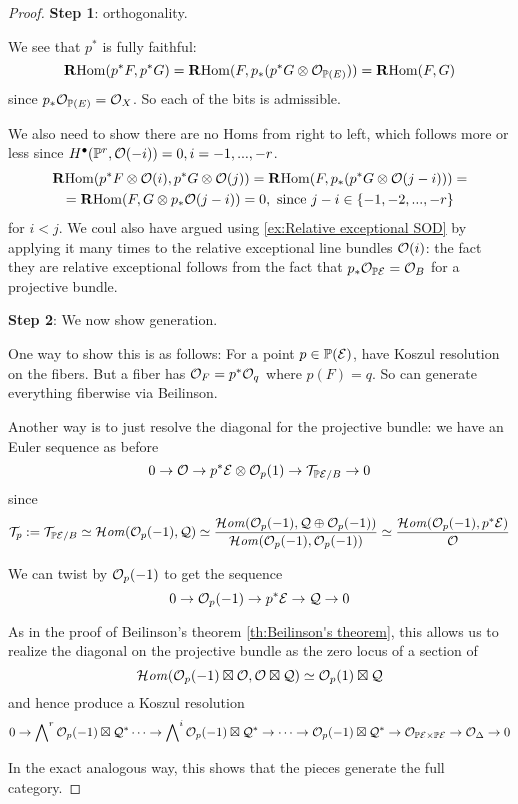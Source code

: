 \begin{proof}
    \textbf{Step 1}: orthogonality.

    We see that $p^*$ is fully faithful:
    \begin{equation*}
        \operatorname{\mathbf{R} Hom}(p^*F,p^*G) = \operatorname{\mathbf{R} Hom}(F,p_*(p^*G\otimes\mathcal{O}_{\mathbb{P}(E)})) = \operatorname{\mathbf{R} Hom}(F,G)
    \end{equation*}
    since $p_*\mathcal{O}_{\mathbb{P}(E)}=\mathcal{O}_X$. So each of the bits is admissible. 
    
    We also need to show there are no Homs from right to left, which follows more or less since $H^\bullet(\mathbb{P}^r, \mathcal{O}(-i))=0, i=-1,...,-r$.
    \begin{gather*}
        \operatorname{\mathbf{R} Hom}(p^*F\otimes\mathcal{O}(i),p^*G\otimes\mathcal{O}(j))
            = \operatorname{\mathbf{R} Hom}(F,p_*(p^*G\otimes \mathcal{O}(j-i))) = \\
            = \operatorname{\mathbf{R} Hom}(F,G\otimes p_*\mathcal{O}(j-i)) = 0, \text{ since } j-i\in \{-1,-2,...,-r\}
    \end{gather*}
for $i<j$. We coul also have argued using \ref{ex:Relative exceptional SOD} by applying it many times to the relative exceptional line bundles $\mathcal{O}(i)$: the fact they are relative exceptional follows from the fact that $p_*\mathcal{O}_{\mathbb{P}\mathcal{E}}=\mathcal{O}_B$ for a projective bundle.

\textbf{Step 2}: We now show generation.

One way to show this is as follows: For a point $p\in\mathbb{P}(\mathcal{E})$, have Koszul resolution on the fibers. But a fiber has $\mathcal{O}_F=p^*\mathcal{O}_q$ where $p(F)=q$. So can generate everything fiberwise via Beilinson.

Another way is to just resolve the diagonal for the projective bundle: we have an Euler sequence as before $$0\rightarrow \mathcal{O}\rightarrow p^* \mathcal{E} \otimes \mathcal{O}_{p}(1)\rightarrow \mathcal{T}_{\mathbb{P}\mathcal{E}/B}\rightarrow 0$$since $$\mathcal{T}_p:=\mathcal{T}_{\mathbb{P}\mathcal{E}/B}\simeq \operatorname{\mathcal{H}\mathit{om}}(\mathcal{O}_{p}(-1),\mathcal{Q})\simeq \frac{\operatorname{\mathcal{H}\mathit{om}}(\mathcal{O}_{p}(-1),\mathcal{Q}\oplus \mathcal{O}_{p}(-1))}{\operatorname{\mathcal{H}\mathit{om}} (\mathcal{O}_{p}(-1), \mathcal{O}_{p}(-1))}\simeq \frac{\operatorname{\mathcal{H}\mathit{om}}(\mathcal{O}_{p}(-1), p^* \mathcal{E})}{ \mathcal{O}}$$ 

We can twist by $\mathcal{O}_p(-1)$ to get the sequence $$0\rightarrow \mathcal{O}_p(-1)\rightarrow p^* \mathcal{E} \rightarrow \mathcal{Q}\rightarrow 0$$

As in the proof of Beilinson's theorem \ref{th:Beilinson's theorem}, this allows us to realize the diagonal on the projective bundle as the zero locus of a section of $$\operatorname{\mathcal{H}\mathit{om}}(\mathcal{O}_p(-1)\boxtimes \mathcal{O}, \mathcal{O}\boxtimes \mathcal{Q})\simeq \mathcal{O}_p(1) \boxtimes \mathcal{Q}$$
and hence produce a Koszul resolution $$0\rightarrow \bigwedge\nolimits^r \mathcal{O}_p(-1) \boxtimes \mathcal{Q}^*\dots\rightarrow \bigwedge\nolimits^i \mathcal{O}_p(-1) \boxtimes \mathcal{Q}^*\rightarrow \dots \rightarrow \mathcal{O}_p(-1) \boxtimes \mathcal{Q}^*\rightarrow \mathcal{O}_{\mathbb{P}\mathcal{E} \times \mathbb{P}\mathcal{E}}\rightarrow \mathcal{O}_{\Delta}\rightarrow 0$$

In the exact analogous way, this shows that the pieces generate the full category.
\end{proof}

